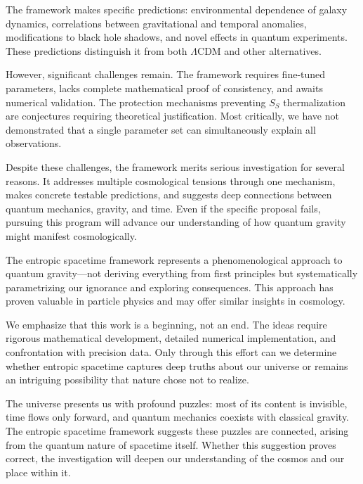 \documentclass[12pt]{article}
\begin{document}
The framework makes specific predictions: environmental dependence of galaxy dynamics, correlations between gravitational and temporal anomalies, modifications to black hole shadows, and novel effects in quantum experiments. These predictions distinguish it from both $\Lambda$CDM and other alternatives.

However, significant challenges remain. The framework requires fine-tuned parameters, lacks complete mathematical proof of consistency, and awaits numerical validation. The protection mechanisms preventing $S_S$ thermalization are conjectures requiring theoretical justification. Most critically, we have not demonstrated that a single parameter set can simultaneously explain all observations.

Despite these challenges, the framework merits serious investigation for several reasons. It addresses multiple cosmological tensions through one mechanism, makes concrete testable predictions, and suggests deep connections between quantum mechanics, gravity, and time. Even if the specific proposal fails, pursuing this program will advance our understanding of how quantum gravity might manifest cosmologically.

The entropic spacetime framework represents a phenomenological approach to quantum gravity---not deriving everything from first principles but systematically parametrizing our ignorance and exploring consequences. This approach has proven valuable in particle physics and may offer similar insights in cosmology.

We emphasize that this work is a beginning, not an end. The ideas require rigorous mathematical development, detailed numerical implementation, and confrontation with precision data. Only through this effort can we determine whether entropic spacetime captures deep truths about our universe or remains an intriguing possibility that nature chose not to realize.

The universe presents us with profound puzzles: most of its content is invisible, time flows only forward, and quantum mechanics coexists with classical gravity. The entropic spacetime framework suggests these puzzles are connected, arising from the quantum nature of spacetime itself. Whether this suggestion proves correct, the investigation will deepen our understanding of the cosmos and our place within it.
\end{document}
